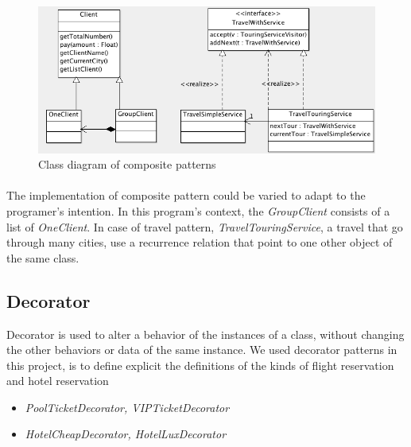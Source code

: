 \begin{figure}[h]
\centering
\includegraphics[width=12cm]{project/images/composite.png}
\caption{Class diagram of composite patterns}
\end{figure}

\paragraph{}
The implementation of composite pattern could be varied to adapt to the programer's intention. In this program's context, the \textit{GroupClient} consists of a list of \textit{OneClient}. In case of travel pattern, \textit{TravelTouringService}, a travel that go through many cities, use a recurrence relation that point to one other object of the same class.

\newpage
\subsection{Decorator}
Decorator is used to alter a behavior of the instances of a class, without changing the other behaviors or data of the same instance. We used decorator patterns in this project, is to define explicit the definitions of the kinds of flight reservation and hotel reservation

\begin{itemize}
\item \textit{PoolTicketDecorator, VIPTicketDecorator}
\item \textit{HotelCheapDecorator, HotelLuxDecorator}
\end{itemize}





